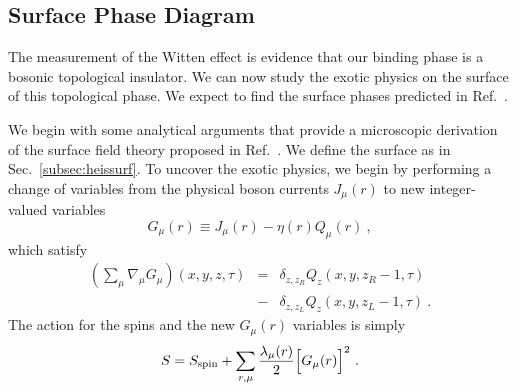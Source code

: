 \subsection{Surface Phase Diagram}
\label{subsec::cp1surface}
The measurement of the Witten effect is evidence that our binding phase is a bosonic topological insulator. We can now study the exotic physics on the surface of this topological phase. We expect to find the surface phases predicted in Ref.~\cite{SenthilVishwanath}.

We begin with some analytical arguments that provide a microscopic derivation of the surface field theory proposed in Ref.~\cite{SenthilVishwanath}.
We define the surface as in Sec.~\ref{subsec:heissurf}. To uncover the exotic physics, we begin by performing a change of variables from the physical boson currents $J_\mu(r)$ to new integer-valued variables
\begin{equation}
G_\mu(r) \equiv J_\mu(r) - \eta(r) Q_\mu(r) ~,
\label{Gchange}
\end{equation}
which satisfy 
\begin{eqnarray*}
\left(\sum_\mu \nabla_\mu G_\mu\right) (x, y, z, \tau) &=& 
\delta_{z, z_R} Q_z(x, y, z_R-1, \tau) \\
&-& \delta_{z, z_L} Q_z(x, y, z_L-1, \tau) ~. 
\end{eqnarray*}
The action for the spins and the new $G_\mu(r)$ variables is simply
\begin{equation}
S = S_{\rm spin} + \sum_{r,\mu} \frac{\lambda_\mu(r)}{2} \Big[G_\mu(r)\Big]^2 ~.
\end{equation}


